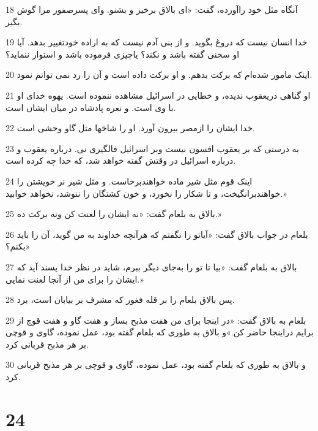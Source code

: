 \par 18 آنگاه مثل خود راآورده، گفت: «ای بالاق برخیز و بشنو. و‌ای پسرصفور مرا گوش بگیر.
\par 19 خدا انسان نیست که دروغ بگوید. و از بنی آدم نیست که به اراده خودتغییر بدهد. آیا او سخنی گفته باشد و نکند؟ یاچیزی فرموده باشد و استوار ننماید؟
\par 20 اینک مامور شده‌ام که برکت بدهم. و او برکت داده است و آن را رد نمی توانم نمود.
\par 21 او گناهی دریعقوب ندیده، و خطایی در اسرائیل مشاهده ننموده است. یهوه خدای او با وی است. و نعره پادشاه در میان ایشان است.
\par 22 خدا ایشان را ازمصر بیرون آورد. او را شاخها مثل گاو وحشی است.
\par 23 به درستی که بر یعقوب افسون نیست وبر اسرائیل فالگیری نی. درباره یعقوب و درباره اسرائیل در وقتش گفته خواهد شد، که خدا چه کرده است.
\par 24 اینک قوم مثل شیر ماده خواهندبرخاست. و مثل شیر نر خویشتن را خواهندبرانگیخت، و تا شکار را نخورد، و خون کشتگان را ننوشد، نخواهد خوابید.»
\par 25 بالاق به بلعام گفت: «نه ایشان را لعنت کن ونه برکت ده.»
\par 26 بلعام در جواب بالاق گفت: «آیاتو را نگفتم که هر‌آنچه خداوند به من گوید، آن را باید بکنم؟»
\par 27 بالاق به بلعام گفت: «بیا تا تو را به‌جای دیگر ببرم، شاید در نظر خدا پسند آید که ایشان را برای من از آنجا لعنت نمایی.»
\par 28 پس بالاق بلعام را بر قله فغور که مشرف بر بیابان است، برد.
\par 29 بلعام به بالاق گفت: «در اینجا برای من هفت مذبح بساز و هفت گاو و هفت قوچ از برایم دراینجا حاضر کن.»و بالاق به طوری که بلعام گفته بود، عمل نموده، گاوی و قوچی بر هر مذبح قربانی کرد.
\par 30 و بالاق به طوری که بلعام گفته بود، عمل نموده، گاوی و قوچی بر هر مذبح قربانی کرد.
 
\chapter{24}

